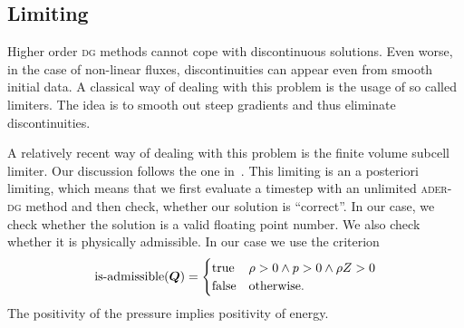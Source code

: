 \subsection{Limiting}\label{sec:limiting}
Higher order \textsc{dg} methods cannot cope with discontinuous solutions.
Even worse, in the case of non-linear fluxes, discontinuities can appear even from smooth initial data.
A classical way of dealing with this problem is the usage of so called limiters.
The idea is to smooth out steep gradients and thus eliminate discontinuities.

A relatively recent way of dealing with this problem is the finite volume subcell limiter.
Our discussion follows the one in~\cite{dumbser2016simple}.
This limiting is an a posteriori limiting, which means that we first evaluate a timestep with an unlimited \textsc{ader-dg} method and then check, whether our solution is \enquote{correct}.
In our case, we check whether the solution is a valid floating point number.
We also check whether it is physically admissible.
In our case we use the criterion
\begin{equation}
  \label{eq:limiting-physical}
  \operatorname{is-admissible}(\bm{Q}) =
  \begin{cases}
    \text{true} & \rho > 0 \land p > 0 \land \rho Z > 0\\
    \text{false} & \text{otherwise}.
  \end{cases}
\end{equation}
The positivity of the pressure implies positivity of energy.


